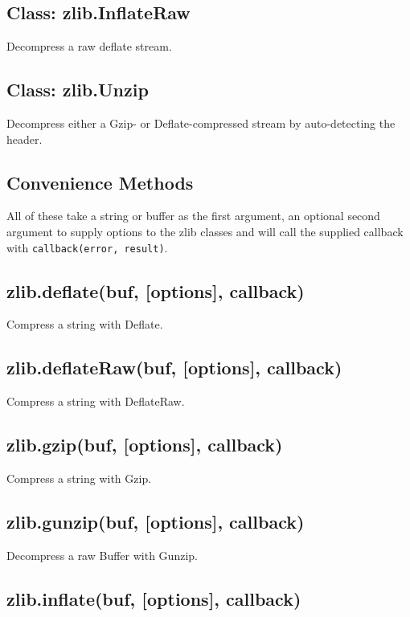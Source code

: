 \subsection{Class: zlib.InflateRaw}

Decompress a raw deflate stream.

\subsection{Class: zlib.Unzip}

Decompress either a Gzip- or Deflate-compressed stream by auto-detecting
the header.

\subsection{Convenience Methods}

All of these take a string or buffer as the first argument, an optional
second argument to supply options to the zlib classes and will call the
supplied callback with \texttt{callback(error, result)}.

\subsection{zlib.deflate(buf, {[}options{]}, callback)}

Compress a string with Deflate.

\subsection{zlib.deflateRaw(buf, {[}options{]}, callback)}

Compress a string with DeflateRaw.

\subsection{zlib.gzip(buf, {[}options{]}, callback)}

Compress a string with Gzip.

\subsection{zlib.gunzip(buf, {[}options{]}, callback)}

Decompress a raw Buffer with Gunzip.

\subsection{zlib.inflate(buf, {[}options{]}, callback)}

